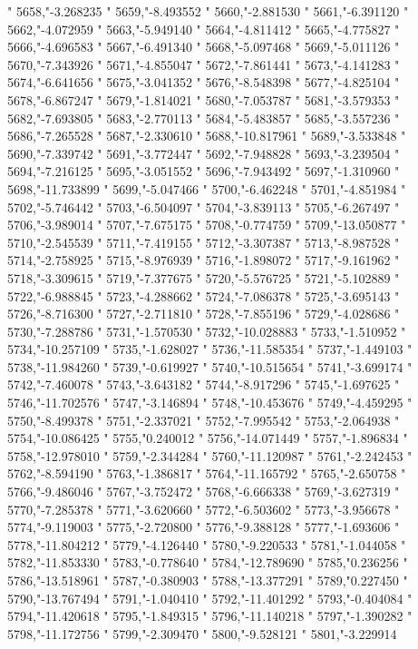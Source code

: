 "
5658,"-3.268235
"
5659,"-8.493552
"
5660,"-2.881530
"
5661,"-6.391120
"
5662,"-4.072959
"
5663,"-5.949140
"
5664,"-4.811412
"
5665,"-4.775827
"
5666,"-4.696583
"
5667,"-6.491340
"
5668,"-5.097468
"
5669,"-5.011126
"
5670,"-7.343926
"
5671,"-4.855047
"
5672,"-7.861441
"
5673,"-4.141283
"
5674,"-6.641656
"
5675,"-3.041352
"
5676,"-8.548398
"
5677,"-4.825104
"
5678,"-6.867247
"
5679,"-1.814021
"
5680,"-7.053787
"
5681,"-3.579353
"
5682,"-7.693805
"
5683,"-2.770113
"
5684,"-5.483857
"
5685,"-3.557236
"
5686,"-7.265528
"
5687,"-2.330610
"
5688,"-10.817961
"
5689,"-3.533848
"
5690,"-7.339742
"
5691,"-3.772447
"
5692,"-7.948828
"
5693,"-3.239504
"
5694,"-7.216125
"
5695,"-3.051552
"
5696,"-7.943492
"
5697,"-1.310960
"
5698,"-11.733899
"
5699,"-5.047466
"
5700,"-6.462248
"
5701,"-4.851984
"
5702,"-5.746442
"
5703,"-6.504097
"
5704,"-3.839113
"
5705,"-6.267497
"
5706,"-3.989014
"
5707,"-7.675175
"
5708,"-0.774759
"
5709,"-13.050877
"
5710,"-2.545539
"
5711,"-7.419155
"
5712,"-3.307387
"
5713,"-8.987528
"
5714,"-2.758925
"
5715,"-8.976939
"
5716,"-1.898072
"
5717,"-9.161962
"
5718,"-3.309615
"
5719,"-7.377675
"
5720,"-5.576725
"
5721,"-5.102889
"
5722,"-6.988845
"
5723,"-4.288662
"
5724,"-7.086378
"
5725,"-3.695143
"
5726,"-8.716300
"
5727,"-2.711810
"
5728,"-7.855196
"
5729,"-4.028686
"
5730,"-7.288786
"
5731,"-1.570530
"
5732,"-10.028883
"
5733,"-1.510952
"
5734,"-10.257109
"
5735,"-1.628027
"
5736,"-11.585354
"
5737,"-1.449103
"
5738,"-11.984260
"
5739,"-0.619927
"
5740,"-10.515654
"
5741,"-3.699174
"
5742,"-7.460078
"
5743,"-3.643182
"
5744,"-8.917296
"
5745,"-1.697625
"
5746,"-11.702576
"
5747,"-3.146894
"
5748,"-10.453676
"
5749,"-4.459295
"
5750,"-8.499378
"
5751,"-2.337021
"
5752,"-7.995542
"
5753,"-2.064938
"
5754,"-10.086425
"
5755,"0.240012
"
5756,"-14.071449
"
5757,"-1.896834
"
5758,"-12.978010
"
5759,"-2.344284
"
5760,"-11.120987
"
5761,"-2.242453
"
5762,"-8.594190
"
5763,"-1.386817
"
5764,"-11.165792
"
5765,"-2.650758
"
5766,"-9.486046
"
5767,"-3.752472
"
5768,"-6.666338
"
5769,"-3.627319
"
5770,"-7.285378
"
5771,"-3.620660
"
5772,"-6.503602
"
5773,"-3.956678
"
5774,"-9.119003
"
5775,"-2.720800
"
5776,"-9.388128
"
5777,"-1.693606
"
5778,"-11.804212
"
5779,"-4.126440
"
5780,"-9.220533
"
5781,"-1.044058
"
5782,"-11.853330
"
5783,"-0.778640
"
5784,"-12.789690
"
5785,"0.236256
"
5786,"-13.518961
"
5787,"-0.380903
"
5788,"-13.377291
"
5789,"0.227450
"
5790,"-13.767494
"
5791,"-1.040410
"
5792,"-11.401292
"
5793,"-0.404084
"
5794,"-11.420618
"
5795,"-1.849315
"
5796,"-11.140218
"
5797,"-1.390282
"
5798,"-11.172756
"
5799,"-2.309470
"
5800,"-9.528121
"
5801,"-3.229914
